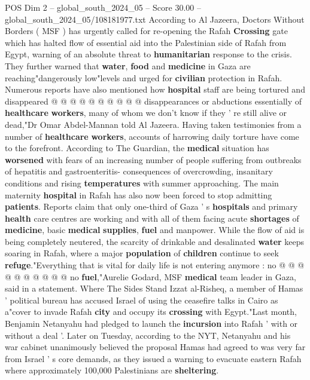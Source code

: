 \begin{textsample}{POS Dim 2 – global\_south\_2024\_05 – Score 30.00 – global\_south\_2024\_05/108181977.txt}
According to Al Jazeera, Doctors Without Borders ( MSF ) has urgently called for re-opening the Rafah \textbf{Crossing} gate which has halted flow of essential aid into the Palestinian side of Rafah from Egypt, warning of an absolute threat to \textbf{humanitarian} response to the crisis.
They further warned that \textbf{water}, \textbf{food} and \textbf{medicine} in Gaza are reaching"dangerously low"levels and urged for \textbf{civilian} protection in Rafah.
Numerous reports have also mentioned how \textbf{hospital} staff are being tortured and disappeared @ @ @ @ @ @ @ @ @ @ disappearances or abductions essentially of \textbf{healthcare} \textbf{workers}, many of whom we don't know if they ' re still alive or dead,"Dr Omar Abdel-Mannan told Al Jazeera.
Having taken testimonies from a number of \textbf{healthcare} \textbf{workers}, accounts of harrowing daily torture have come to the forefront.
According to The Guardian, the \textbf{medical} situation has \textbf{worsened} with fears of an increasing number of people suffering from outbreaks of hepatitis and gastroenteritis- consequences of overcrowding, insanitary conditions and rising \textbf{temperatures} with summer approaching.
The main maternity \textbf{hospital} in Rafah has also now been forced to stop admitting \textbf{patients}.
Reports claim that only one-third of Gaza ' s \textbf{hospitals} and primary \textbf{health} care centres are working and with all of them facing acute \textbf{shortages} of \textbf{medicine}, basic \textbf{medical} \textbf{supplies}, \textbf{fuel} and manpower.
While the flow of aid is being completely neutered, the scarcity of drinkable and desalinated \textbf{water} keeps soaring in Rafah, where a major \textbf{population} of \textbf{children} continue to seek \textbf{refuge}."Everything that is vital for daily life is not entering anymore : no @ @ @ @ @ @ @ @ @ @ no \textbf{fuel},"Aurelie Godard, MSF \textbf{medical} team leader in Gaza, said in a statement.
Where The Sides Stand Izzat al-Risheq, a member of Hamas ' political bureau has accused Israel of using the ceasefire talks in Cairo as a"cover to invade Rafah \textbf{city} and occupy its \textbf{crossing} with Egypt."Last month, Benjamin Netanyahu had pledged to launch the \textbf{incursion} into Rafah ' with or without a deal '.
Later on Tuesday, according to the NYT, Netanyahu and his war cabinet unanimously believed the proposal Hamas had agreed to was very far from Israel ' s core demands, as they issued a warning to evacuate eastern Rafah where approximately 100,000 Palestinians are \textbf{sheltering}.

\end{textsample}

